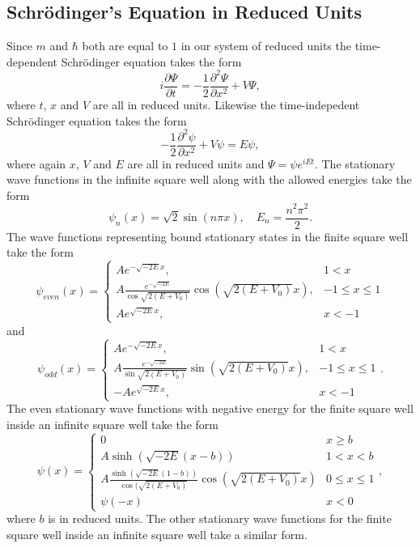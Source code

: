 \documentclass[12pt,a4paper]{article}
\newcommand{\pdiff}[2]{\frac{\partial #1}{\partial #2}}
\newcommand{\pdiffn}[3]{\frac{\partial^{#3} #1}{\partial #2^{#3}}}
\begin{document}
\subsection{Schrödinger's Equation in Reduced Units}
Since $m$ and $\hbar$ both are equal to $1$ in our system of reduced units the time-dependent Schrödinger equation takes the form
\begin{equation}
i \pdiff{\Psi}{t} = - \frac{1}{2} \pdiffn{\Psi}{x}{2} + V \Psi,
\end{equation}
where $t$, $x$ and $V$ are all in reduced units. Likewise the time-indepedent Schrödinger equation takes the form
\begin{equation}
- \frac{1}{2} \pdiffn{\psi}{x}{2} + V \psi = E \psi,
\end{equation}
where again $x$, $V$ and $E$ are all in reduced units and $\Psi = \psi e^{i E t}$. The stationary wave functions in the infinite square well along with the allowed energies take the form
\begin{equation}
\psi_n(x) = \sqrt{2} \sin (n \pi x), \quad E_n = \frac{n^2 \pi^2}{2}.
\end{equation}
The wave functions representing bound stationary states in the finite square well take the form
\begin{equation}
\psi_{even}(x) = \begin{cases} A e^{-\sqrt{-2 E} x}, & 1 < x \\
                               A \frac{e^{-\sqrt{-2 E}}}{\cos \sqrt{2(E + V_0)}} \cos \left( \sqrt{2(E + V_0)} x \right), & -1 \leq x \leq 1 \\
                               A e^{\sqrt{-2 E} x}, & x < -1 \end{cases}
\end{equation}
and
\begin{equation}
\psi_{odd}(x) = \begin{cases} A e^{-\sqrt{-2 E} x}, & 1 < x \\
                              A \frac{e^{-\sqrt{-2 E}}}{\sin \sqrt{2(E + V_0)}} \sin \left( \sqrt{2(E + V_0)} x \right), & -1 \leq x \leq 1 \\
                              -A e^{\sqrt{-2 E} x}, & x < -1 \end{cases}.
\end{equation}
The even stationary wave functions with negative energy for the finite square well inside an infinite square well take the form
\begin{equation}
\psi(x) = \begin{cases} 0 & x \geq b \\
                        A \sinh \left(\sqrt{- 2 E} (x - b) \right) & 1 < x < b \\
                        A \frac{\sinh \left(\sqrt{- 2 E} (1 - b) \right)}{\cos (\sqrt{2 (E + V_0)}} \cos \left(\sqrt{2 (E + V_0)} x \right) & 0 \leq x \leq 1 \\
                        \psi(-x) & x < 0
\end{cases},
\end{equation}
where $b$ is in reduced units. The other stationary wave functions for the finite square well inside an infinite square well take a similar form.
\end{document}
